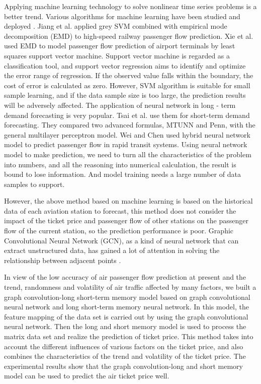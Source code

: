 \documentclass[journal,article,submit,moreauthors,pdftex]{Definitions/mdpi}
\begin{document}
\par Applying machine learning technology to solve nonlinear time series problems \cite{6} is a better trend. Various algorithms for machine learning have been studied and deployed \cite{carmona2020sarima,nieto2018arima+,madhavan2020short,pan2018novel}. Jiang et al.\cite{7} applied grey SVM combined with empirical mode decomposition (EMD) to high-speed railway passenger flow prediction. Xie et al. \cite{8} used EMD to model passenger flow prediction of airport terminals by least squares support vector machine. Support vector machine is regarded as a classification tool, and support vector regression aims to identify and optimize the error range of regression. If the observed value falls within the boundary, the cost of error is calculated as zero. However, SVM algorithm is suitable for small sample learning, and if the data sample size is too large, the prediction results will be adversely affected. The application of neural network in long - term demand forecasting is very popular. Tsai et al. \cite{9} use them for short-term demand forecasting. They compared two advanced formulas, MTUNN and Penn, with the general multilayer perceptron model. Wei and Chen \cite{10} used hybrid neural network model to predict passenger flow in rapid transit systems. Using neural network model to make prediction, we need to turn all the characteristics of the problem into numbers, and all the reasoning into numerical calculation, the result is bound to lose information. And model training needs a large number of data samples to support. 
\par However, the above method based on machine learning is based on the historical data of each aviation station to forecast, this method does not consider the impact of the ticket price and passenger flow of other stations on the passenger flow of the current station, so the prediction performance is poor. Graphic Convolutional Neural Network (GCN), as a kind of neural network that can extract unstructured data, has gained a lot of attention in solving the relationship between adjacent points \cite{geng2019spatiotemporal, he2020lightgcn, wei2019mmgcn}.
\par  In view of the low accuracy of air passenger flow prediction at present and the trend, randomness and volatility of air traffic affected by many factors, we built a graph convolution-long short-term memory model based on graph convolutional neural network and long short-term memory neural network. In this model, the feature mapping of the data set is carried out by using the graph convolutional neural network. Then the long and short memory model is used to process the matrix data set and realize the prediction of ticket price. This method takes into account the different influences of various factors on the ticket price, and also combines the characteristics of the trend and volatility of the ticket price. The experimental results show that the graph convolution-long and short memory model can be used to predict the air ticket price well.
\end{document}
